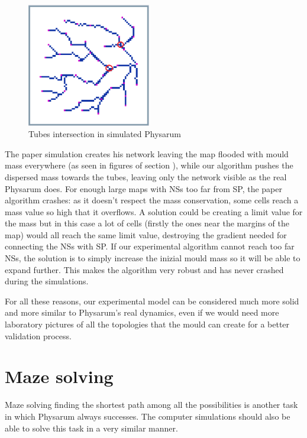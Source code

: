 \begin{figure}[H]
  \centering
    \includegraphics[width=0.48\textwidth]{wsn_40_red_intersection}%
    
  \caption{Tubes intersection in simulated Physarum}
  \label{fig:wsn_40_red_intersection}
\end{figure}

\par
The paper simulation creates his network leaving the map flooded with mould mass everywhere (as seen in figures of section ), while our algorithm pushes the dispersed mass towards the tubes, leaving only the network visible as the real Physarum does. For enough large maps with NSs too far from SP, the paper algorithm crashes: as it doesn't respect the mass conservation, some cells reach a mass value so high that it overflows. A solution could be creating a limit value for the mass but in this case a lot of cells (firstly the ones near the margins of the map) would all reach the same limit value, destroying the gradient needed for connecting the NSs with SP.
If our experimental algorithm cannot reach too far NSs, the solution is to simply increase the inizial mould mass so it will be able to expand further. This makes the algorithm very robust and has never crashed during the simulations.

\par
For all these reasons, our experimental model can be considered much more solid and more similar to Physarum's real dynamics, even if we would need more laboratory pictures of all the topologies that the mould can create for a better validation process.

\section{Maze solving}

Maze solving finding the shortest path among all the possibilities is another task in which Physarum always successes. The computer simulations should also be able to solve this task in a very similar manner.

